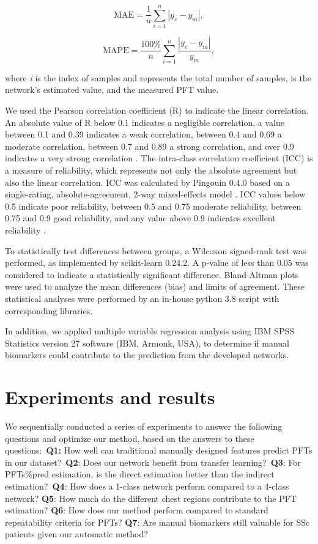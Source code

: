\begin{equation}
\mathrm{MAE} = \frac{1}{n}\sum_{i=1}^{n}| y_e - y_m |,
\end{equation}

\begin{equation}
\mathrm{MAPE} = \frac{100\%}{n}\sum_{i=1}^{n} \frac{\left|y_e - y_m \right|}{y_m},
\end{equation}

where \textit{i} is the index of samples and  represents the total number of samples,  is the network’s estimated value, and  the measured PFT value.

We used the Pearson correlation coefficient (R) to indicate the linear correlation. An absolute value of R below 0.1 indicates a negligible correlation, a value between 0.1 and 0.39 indicates a weak correlation, between 0.4 and 0.69 a moderate correlation, between 0.7 and 0.89 a strong correlation, and over 0.9 indicates a very strong correlation \cite{Schober2018}. The intra-class correlation coefficient (ICC) is a measure of reliability, which represents not only the absolute agreement but also the linear correlation. ICC was calculated by Pingouin 0.4.0 \cite{Vallat2018} based on a single-rating, absolute-agreement, 2-way mixed-effects model \cite{Koo2016}. ICC values below 0.5 indicate poor reliability, between 0.5 and 0.75 moderate reliability, between 0.75 and 0.9 good reliability, and any value above 0.9 indicates excellent reliability \cite{Koo2016}.

To statistically test differences between groups, a Wilcoxon signed-rank test was performed, as implemented by scikit-learn 0.24.2. A p-value of less than 0.05 was considered to indicate a statistically significant difference. Bland-Altman plots were used to analyze the mean differences (bias) and limits of agreement. These statistical analyses were performed by an in-house python 3.8 script with corresponding libraries. 

In addition, we applied multiple variable regression analysis using IBM SPSS Statistics version 27 software (IBM, Armonk, USA), to determine if manual biomarkers could contribute to the prediction from the developed networks. 





\section{Experiments and results}
We sequentially conducted a series of experiments to answer the following questions and optimize our method, based on the answers to these questions: \textbf{Q1:} How well can traditional manually designed features predict PFTs in our dataset? \textbf{Q2}: Does our network benefit from transfer learning? \textbf{Q3}: For PFTs\%pred estimation, is the direct estimation better than the indirect estimation? \textbf{Q4}: How does a 1-class network perform compared to a 4-class network? \textbf{Q5}: How much do the different chest regions contribute to the PFT estimation?\textbf{ Q6}: How does our method perform compared to standard repeatability criteria for PFTs? \textbf{Q7}: Are manual biomarkers still valuable for SSc patients given our automatic method? 

